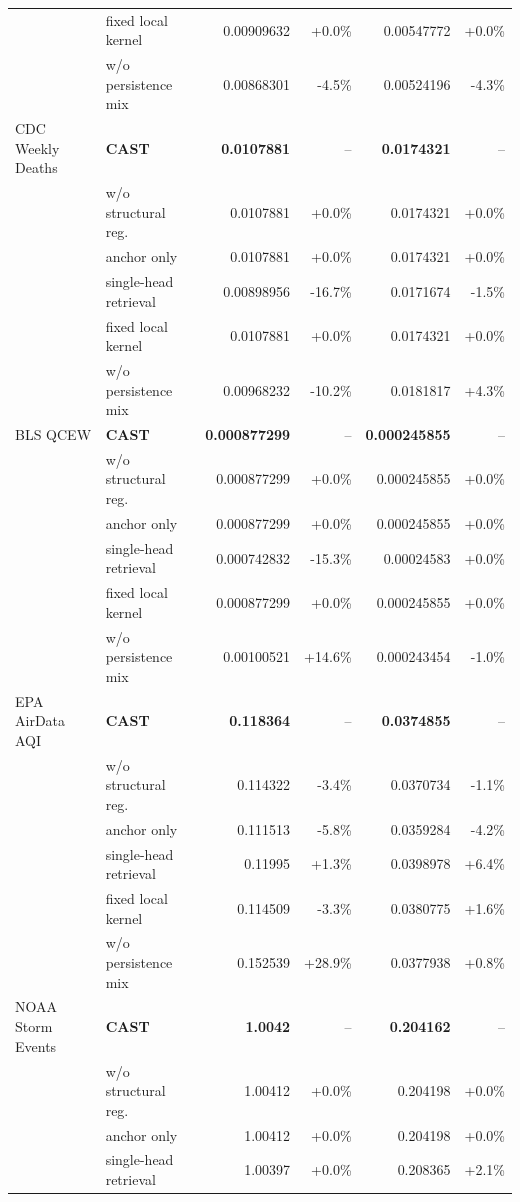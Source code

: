 \begin{longtable}{@{}llrrrr@{}}
 & fixed local kernel & 0.00909632 & +0.0\% & 0.00547772 & +0.0\% \\
 & w/o persistence mix & 0.00868301 & -4.5\% & 0.00524196 & -4.3\% \\
\addlinespace
CDC Weekly Deaths & \textbf{CAST} & \textbf{0.0107881} & -- & \textbf{0.0174321} & -- \\
 & w/o structural reg. & 0.0107881 & +0.0\% & 0.0174321 & +0.0\% \\
 & anchor only & 0.0107881 & +0.0\% & 0.0174321 & +0.0\% \\
 & single-head retrieval & 0.00898956 & -16.7\% & 0.0171674 & -1.5\% \\
 & fixed local kernel & 0.0107881 & +0.0\% & 0.0174321 & +0.0\% \\
 & w/o persistence mix & 0.00968232 & -10.2\% & 0.0181817 & +4.3\% \\
\addlinespace
BLS QCEW & \textbf{CAST} & \textbf{0.000877299} & -- & \textbf{0.000245855} & -- \\
 & w/o structural reg. & 0.000877299 & +0.0\% & 0.000245855 & +0.0\% \\
 & anchor only & 0.000877299 & +0.0\% & 0.000245855 & +0.0\% \\
 & single-head retrieval & 0.000742832 & -15.3\% & 0.00024583 & +0.0\% \\
 & fixed local kernel & 0.000877299 & +0.0\% & 0.000245855 & +0.0\% \\
 & w/o persistence mix & 0.00100521 & +14.6\% & 0.000243454 & -1.0\% \\
\addlinespace
EPA AirData AQI & \textbf{CAST} & \textbf{0.118364} & -- & \textbf{0.0374855} & -- \\
 & w/o structural reg. & 0.114322 & -3.4\% & 0.0370734 & -1.1\% \\
 & anchor only & 0.111513 & -5.8\% & 0.0359284 & -4.2\% \\
 & single-head retrieval & 0.11995 & +1.3\% & 0.0398978 & +6.4\% \\
 & fixed local kernel & 0.114509 & -3.3\% & 0.0380775 & +1.6\% \\
 & w/o persistence mix & 0.152539 & +28.9\% & 0.0377938 & +0.8\% \\
\addlinespace
NOAA Storm Events & \textbf{CAST} & \textbf{1.0042} & -- & \textbf{0.204162} & -- \\
 & w/o structural reg. & 1.00412 & +0.0\% & 0.204198 & +0.0\% \\
 & anchor only & 1.00412 & +0.0\% & 0.204198 & +0.0\% \\
 & single-head retrieval & 1.00397 & +0.0\% & 0.208365 & +2.1\% \\

\end{longtable}
